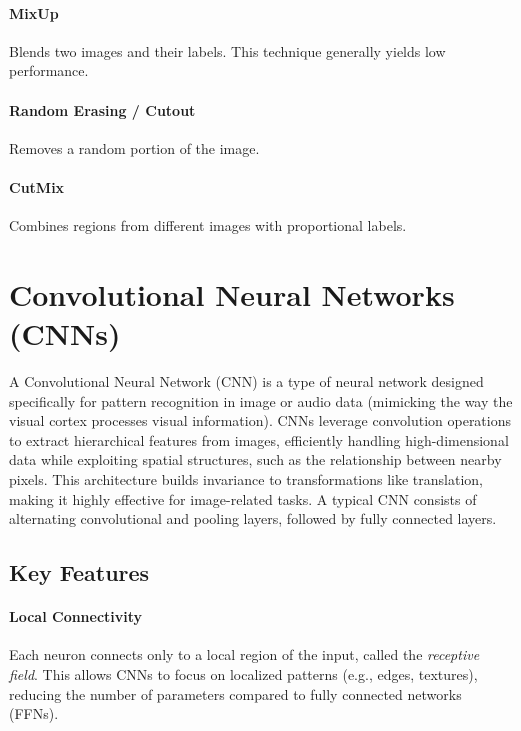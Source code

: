 \documentclass{article}
\begin{document}
\paragraph{MixUp} Blends two images and their labels. This technique generally yields low performance.

\paragraph{Random Erasing / Cutout} Removes a random portion of the image.

\paragraph{CutMix} Combines regions from different images with proportional labels.

\clearpage\newpage

\section{Convolutional Neural Networks (CNNs)} \label{sec:cnn}

A Convolutional Neural Network (CNN) is a type of neural network designed specifically for pattern recognition in image or audio data (mimicking the way the visual cortex processes visual information). CNNs leverage convolution operations to extract hierarchical features from images, efficiently handling high-dimensional data while exploiting spatial structures, such as the relationship between nearby pixels. This architecture builds invariance to transformations like translation, making it highly effective for image-related tasks. A typical CNN consists of alternating convolutional and pooling layers, followed by fully connected layers.

\subsection{Key Features}
\paragraph{Local Connectivity} Each neuron connects only to a local region of the input, called the \textit{receptive field}. This allows CNNs to focus on localized patterns (e.g., edges, textures), reducing the number of parameters compared to fully connected networks (FFNs).
\end{document}
